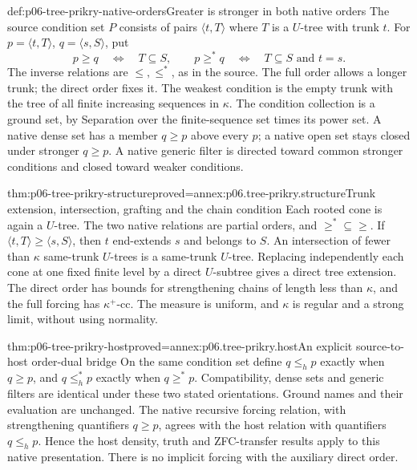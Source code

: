 \begin{hbdefinition}{def:p06-tree-prikry-native-orders}{Greater is stronger in both native orders}
The source condition set \(P\) consists of pairs \(\langle t,T\rangle\)
where \(T\) is a \(U\)-tree with trunk \(t\). For
\(p=\langle t,T\rangle\), \(q=\langle s,S\rangle\), put
\[
 p\geq q\quad\Longleftrightarrow\quad T\subseteq S,
 \qquad
 p\geq^*q\quad\Longleftrightarrow\quad T\subseteq S\text{ and }t=s.
\]
The inverse relations are \(\leq,\leq^*\), as in the source.
The full order allows a longer trunk; the direct order fixes it.
The weakest condition is the empty trunk with the tree of all finite
increasing sequences in \(\kappa\). The condition collection is a
ground set, by Separation over the finite-sequence set times its power
set. A native dense set has a member
\(q\geq p\) above every \(p\); a native open set stays closed under
stronger \(q\geq p\). A native generic filter is directed toward
common stronger conditions and closed toward weaker conditions.
\end{hbdefinition}

\begin{hblemma}{thm:p06-tree-prikry-structure}{proved=annex:p06.tree-prikry.structure}{Trunk extension, intersection, grafting and the chain condition}
Each rooted cone is again a \(U\)-tree. The two native relations are partial orders, and
\(\geq^*\subseteq\geq\). If \(\langle t,T\rangle\geq\langle s,S\rangle\),
then \(t\) end-extends \(s\) and belongs to \(S\).
An intersection of fewer than \(\kappa\) same-trunk \(U\)-trees is
a same-trunk \(U\)-tree. Replacing independently each cone at one
fixed finite level by a direct \(U\)-subtree gives a direct tree extension.
The direct order has bounds for strengthening chains of length less than
\(\kappa\), and the full forcing has \(\kappa^+\)-cc.
The measure is uniform, and \(\kappa\) is regular and a strong limit,
without using normality.
\end{hblemma}

\begin{hblemma}{thm:p06-tree-prikry-host}{proved=annex:p06.tree-prikry.host}{An explicit source-to-host order-dual bridge}
On the same condition set define
\(q\leq_h p\) exactly when \(q\geq p\), and
\(q\leq_h^*p\) exactly when \(q\geq^*p\).
Compatibility, dense sets and generic filters are identical under these
two stated orientations. Ground names and their evaluation are unchanged.
The native recursive forcing relation, with strengthening quantifiers
\(q\geq p\), agrees with the host relation with quantifiers
\(q\leq_h p\). Hence the host density, truth and ZFC-transfer results
apply to this native presentation. There is no implicit forcing with the
auxiliary direct order.
\end{hblemma}

